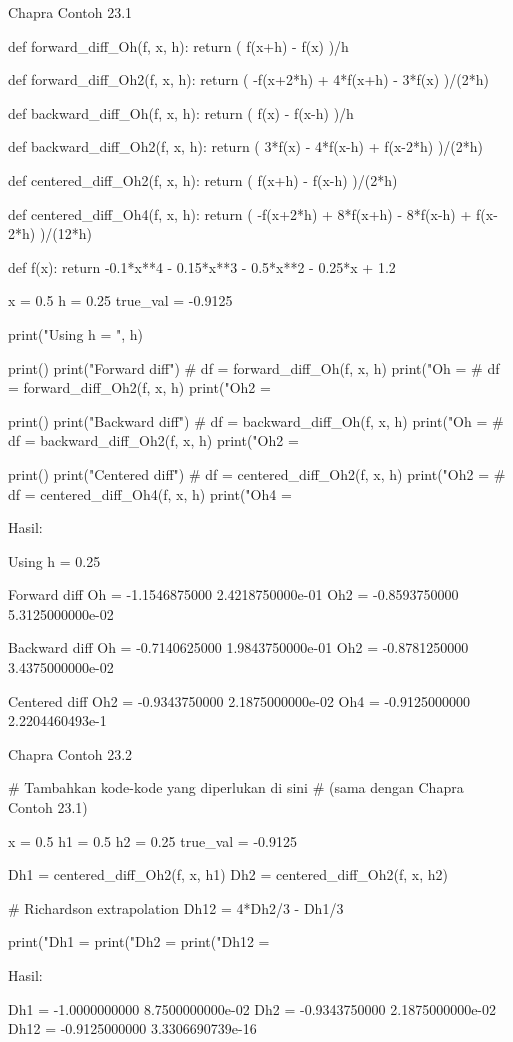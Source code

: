 Chapra Contoh 23.1
\begin{pythoncode}
def forward_diff_Oh(f, x, h):
    return ( f(x+h) - f(x) )/h

def forward_diff_Oh2(f, x, h):
    return ( -f(x+2*h) + 4*f(x+h) - 3*f(x) )/(2*h)

def backward_diff_Oh(f, x, h):
    return ( f(x) - f(x-h) )/h

def backward_diff_Oh2(f, x, h):
    return ( 3*f(x) - 4*f(x-h) + f(x-2*h) )/(2*h)

def centered_diff_Oh2(f, x, h):
    return ( f(x+h) - f(x-h) )/(2*h)

def centered_diff_Oh4(f, x, h):
    return ( -f(x+2*h) + 8*f(x+h) - 8*f(x-h) + f(x-2*h) )/(12*h)

def f(x):
    return -0.1*x**4 - 0.15*x**3 - 0.5*x**2 - 0.25*x + 1.2

x = 0.5
h = 0.25
true_val = -0.9125

print("Using h = ", h)

print()
print("Forward diff")
#
df = forward_diff_Oh(f, x, h)
print("Oh  = %
#
df = forward_diff_Oh2(f, x, h)
print("Oh2 = %


print()
print("Backward diff")
#
df = backward_diff_Oh(f, x, h)
print("Oh  = %
#
df = backward_diff_Oh2(f, x, h)
print("Oh2 = %

print()
print("Centered diff")
#
df = centered_diff_Oh2(f, x, h)
print("Oh2 = %
#
df = centered_diff_Oh4(f, x, h)
print("Oh4 = %
\end{pythoncode}

Hasil:
\begin{textcode}
Using h =  0.25

Forward diff
Oh  =      -1.1546875000   2.4218750000e-01
Oh2 =      -0.8593750000   5.3125000000e-02
    
Backward diff
Oh  =      -0.7140625000   1.9843750000e-01
Oh2 =      -0.8781250000   3.4375000000e-02
    
Centered diff
Oh2 =      -0.9343750000   2.1875000000e-02
Oh4 =      -0.9125000000   2.2204460493e-1
\end{textcode}

Chapra Contoh 23.2
\begin{pythoncode}
# Tambahkan kode-kode yang diperlukan di sini
# (sama dengan Chapra Contoh 23.1)

x = 0.5
h1 = 0.5
h2 = 0.25
true_val = -0.9125

Dh1 = centered_diff_Oh2(f, x, h1)
Dh2 = centered_diff_Oh2(f, x, h2)

# Richardson extrapolation
Dh12 = 4*Dh2/3 - Dh1/3

print("Dh1  = %
print("Dh2  = %
print("Dh12 = %
\end{pythoncode}

Hasil:
\begin{textcode}
Dh1  =      -1.0000000000   8.7500000000e-02
Dh2  =      -0.9343750000   2.1875000000e-02
Dh12 =      -0.9125000000   3.3306690739e-16    
\end{textcode}